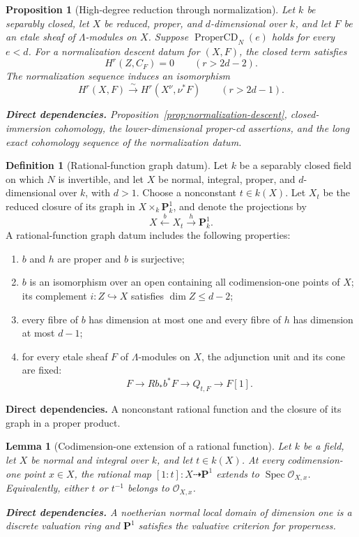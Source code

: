 \documentclass[10pt]{article}
\newtheorem{proposition}[theorem]{Proposition}
\newtheorem{lemma}[theorem]{Lemma}
\theoremstyle{definition}
\newtheorem{definition}[theorem]{Definition}
\newcommand{\Spec}{\operatorname{Spec}}
\newcommand{\deps}[1]{\par\smallskip\noindent\textbf{Direct dependencies.} #1}
\begin{document}
\begin{proposition}[High-degree reduction through normalization]
\label{prop:normalization-high-degree}
Let $k$ be separably closed, let $X$ be reduced, proper, and
$d$-dimensional over $k$, and let $F$ be an etale sheaf of $\Lambda$-modules
on $X$.  Suppose $\operatorname{ProperCD}_N(e)$ holds for every $e<d$.  For
a normalization descent datum for $(X,F)$, the closed term satisfies
\[
 H^r(Z,C_F)=0\qquad(r>2d-2).
\]
The normalization sequence induces an isomorphism
\[
 H^r(X,F)\xrightarrow{\ \sim\ }
 H^r(X^\nu,\nu^*F)\qquad(r>2d-1).
\]
\deps{Proposition~\ref{prop:normalization-descent}, closed-immersion
cohomology, the lower-dimensional proper-cd assertions, and the long exact
cohomology sequence of the normalization datum.}
\end{proposition}

\begin{definition}[Rational-function graph datum]
\label{def:graph-datum}
Let $k$ be a separably closed field on which $N$ is invertible, and let $X$
be normal, integral, proper, and $d$-dimensional over $k$, with $d>1$.
Choose a nonconstant $t\in k(X)$.  Let $X_t$ be the reduced closure
of its graph in $X\times_k\mathbf P^1_k$, and denote the projections by
\[
 X\xleftarrow{\ b\ }X_t\xrightarrow{\ h\ }\mathbf P^1_k.
\]
A rational-function graph datum includes the following properties:
\begin{enumerate}
\item $b$ and $h$ are proper and $b$ is surjective;
\item $b$ is an isomorphism over an open containing all codimension-one
      points of $X$; its complement $i:Z\hookrightarrow X$ satisfies
      $\dim Z\leq d-2$;
\item every fibre of $b$ has dimension at most one and every fibre of $h$
      has dimension at most $d-1$;
\item for every etale sheaf $F$ of $\Lambda$-modules on $X$, the adjunction
      unit and its cone are fixed:
      \[
       F\longrightarrow Rb_*b^*F\longrightarrow Q_{t,F}\longrightarrow F[1].
      \]
\end{enumerate}
\deps{A nonconstant rational function and the closure of its graph in a
proper product.}
\end{definition}

\begin{lemma}[Codimension-one extension of a rational function]
\label{lem:codimension-one-rational-map}
Let $k$ be a field, let $X$ be normal and integral over $k$, and let
$t\in k(X)$.  At every codimension-one
point $x\in X$, the rational map $[1:t]:X\dashrightarrow\mathbf P^1$ extends
to $\Spec\mathcal O_{X,x}$.  Equivalently, either $t$ or $t^{-1}$ belongs to
$\mathcal O_{X,x}$.
\deps{A noetherian normal local domain of dimension one is a discrete
valuation ring and $\mathbf P^1$ satisfies the valuative criterion for
properness.}
\end{lemma}
\end{document}

